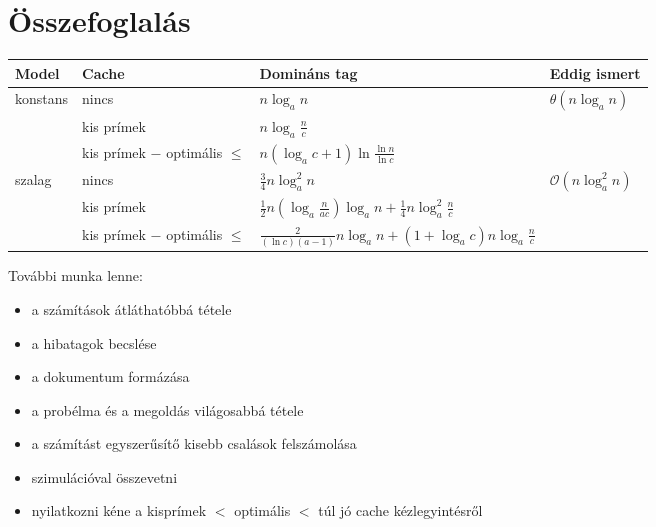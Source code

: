 \documentclass{article}
\begin{document}
\section{Összefoglalás}

\begin{tabular}{|l|l|l|l|}
\hline
Model & Cache & Domináns tag & Eddig ismert \\
\hline
\multirow{3}{*}{konstans} & nincs & $n \log_{a}{n}$ & $\theta(n \log_{a}{n})$ \\
\cline{2-4}
 & kis prímek & $n \log_{a}{\frac{n}{c}}$ & \\
\cline{2-4}
 & kis prímek $-$ optimális $\le$ & $n \left( \log_{a}{c} + 1 \right) \ln{\frac{\ln{n}}{\ln{c}}}$ & \\
\hline
\multirow{3}{*}{szalag}  & nincs & $\frac{3}{4} n \log_{a}^2{n}$ & $\mathcal{O}(n \log^2_{a}{n})$ \\
\cline{2-4}
 & kis prímek & $\frac{1}{2} n \left( \log_{a}{\frac{n}{a c}} \right) \log_{a}{n} + \frac{1}{4} n \log_{a}^2{\frac{n}{c}}$ & \\
\cline{2-4}
 & kis prímek $-$ optimális $\le$ & $\frac{2 }{(\ln{c}) (a-1)} n \log_{a}{n} + \left( 1 + \log_{a}{c} \right) n \log_{a}{\frac{n}{c}}$ & \\
\hline
\end{tabular}

További munka lenne:
\begin{itemize}
\item a számítások átláthatóbbá tétele
\item a hibatagok becslése
\item a dokumentum formázása
\item a probélma és a megoldás világosabbá tétele
\item a számítást egyszerűsítő kisebb csalások felszámolása
\item szimulációval összevetni
\item nyilatkozni kéne a kisprímek $<$ optimális $<$ túl jó cache kézlegyintésről
\end{itemize}
\end{document}
